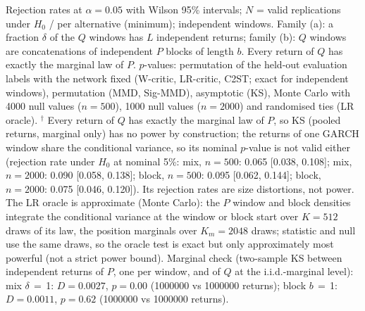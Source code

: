 Rejection rates at $\alpha=0.05$ with Wilson 95\% intervals; $N$ = valid replications under $H_0$ / per alternative (minimum); independent windows. Family (a): a fraction $\delta$ of the $Q$ windows has $L$ independent returns; family (b): $Q$ windows are concatenations of independent $P$ blocks of length $b$. Every return of $Q$ has exactly the marginal law of $P$.
$p$-values: permutation of the held-out evaluation labels with the network fixed (W-critic, LR-critic, C2ST; exact for independent windows), permutation (MMD, Sig-MMD), asymptotic (KS), Monte Carlo with 4000 null values ($n=500$), 1000 null values ($n=2000$) and randomised ties (LR oracle).
$^{\dagger}$ Every return of $Q$ has exactly the marginal law of $P$, so KS (pooled returns, marginal only) has no power by construction; the returns of one GARCH window share the conditional variance, so its nominal $p$-value is not valid either (rejection rate under $H_0$ at nominal 5\%: mix, $n=500$: 0.065 [0.038, 0.108]; mix, $n=2000$: 0.090 [0.058, 0.138]; block, $n=500$: 0.095 [0.062, 0.144]; block, $n=2000$: 0.075 [0.046, 0.120]). Its rejection rates are size distortions, not power.
The LR oracle is approximate (Monte Carlo): the $P$ window and block densities integrate the conditional variance at the window or block start over $K=512$ draws of its law, the position marginals over $K_m=2048$ draws; statistic and null use the same draws, so the oracle test is exact but only approximately most powerful (not a strict power bound).
Marginal check (two-sample KS between independent returns of $P$, one per window, and of $Q$ at the i.i.d.-marginal level): mix $\delta$$\,=\,$1: $D=0.0027$, $p=0.00$ (1000000 vs 1000000 returns); block $b$$\,=\,$1: $D=0.0011$, $p=0.62$ (1000000 vs 1000000 returns).
